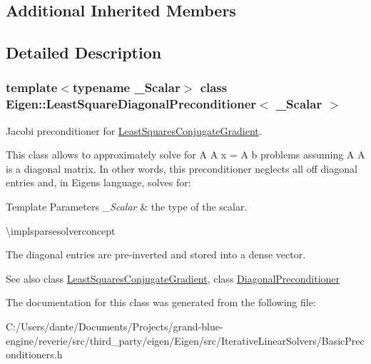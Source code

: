 \subsection*{Additional Inherited Members}


\subsection{Detailed Description}
\subsubsection*{template$<$typename \+\_\+\+Scalar$>$\newline
class Eigen\+::\+Least\+Square\+Diagonal\+Preconditioner$<$ \+\_\+\+Scalar $>$}

Jacobi preconditioner for \mbox{\hyperlink{class_eigen_1_1_least_squares_conjugate_gradient}{Least\+Squares\+Conjugate\+Gradient}}. 

This class allows to approximately solve for A\textquotesingle{} A x = A\textquotesingle{} b problems assuming A\textquotesingle{} A is a diagonal matrix. In other words, this preconditioner neglects all off diagonal entries and, in Eigen\textquotesingle{}s language, solves for\+: 
\begin{DoxyCode}{0}
\end{DoxyCode}



\begin{DoxyTemplParams}{Template Parameters}
{\em \+\_\+\+Scalar} & the type of the scalar.\\
\hline
\end{DoxyTemplParams}
\textbackslash{}implsparsesolverconcept

The diagonal entries are pre-\/inverted and stored into a dense vector.

\begin{DoxySeeAlso}{See also}
class \mbox{\hyperlink{class_eigen_1_1_least_squares_conjugate_gradient}{Least\+Squares\+Conjugate\+Gradient}}, class \mbox{\hyperlink{class_eigen_1_1_diagonal_preconditioner}{Diagonal\+Preconditioner}} 
\end{DoxySeeAlso}


The documentation for this class was generated from the following file\+:\begin{DoxyCompactItemize}
\item 
C\+:/\+Users/dante/\+Documents/\+Projects/grand-\/blue-\/engine/reverie/src/third\+\_\+party/eigen/\+Eigen/src/\+Iterative\+Linear\+Solvers/Basic\+Preconditioners.\+h\end{DoxyCompactItemize}

